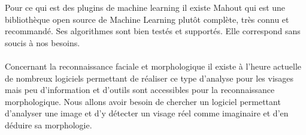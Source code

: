 \documentclass[a4paper,12pt]{article}
\begin{document}
Pour ce qui est des plugins de machine learning il existe Mahout qui est une bibliothèque open source de Machine Learning plutôt complète, très connu et recommandé. Ses algorithmes sont bien testés et supportés. Elle correspond sans soucis à nos besoins. 
\\ \\
Concernant la reconnaissance faciale et morphologique il existe à l'heure actuelle de nombreux logiciels permettant de réaliser ce type d'analyse pour les visages mais peu d'information et d'outils sont accessibles pour la reconnaissance morphologique. Nous allons avoir besoin de chercher un logiciel permettant d'analyser une image et d'y détecter un visage réel comme imaginaire et d'en déduire sa morphologie. 




	


\end{document}
